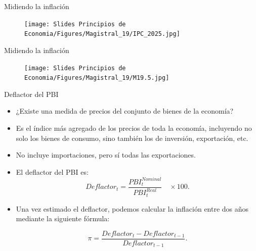 \documentclass{beamer}
\begin{document}
\begin{frame}{Midiendo la inflación}
\begin{figure} [H]  
\texttt{[image: Slides Principios de Economia/Figures/Magistral\_19/IPC\_2025.jpg]}
\end{figure}
\end{frame}


\begin{frame}{Midiendo la inflación}
\begin{figure} [H]  
\texttt{[image: Slides Principios de Economia/Figures/Magistral\_19/M19.5.jpg]}
\end{figure}
\end{frame}

\begin{frame}{Deflactor del PBI }
\begin{itemize}
\item ¿Existe una medida de precios del conjunto de bienes de la economía? 
\item Es el índice más agregado de los precios de toda la economía, incluyendo no solo los bienes de consumo, sino también los de inversión, exportación, etc. 
\item No incluye importaciones, pero sí todas las exportaciones.
\item El deflactor del PBI es:  \vspace{1mm}
\begin{equation*}
    Deflactor_{t}=\frac{PBI_{t}^{Nominal}}{PBI_{t}^{Real}}\quad \times 100.
\end{equation*}

\item Una vez estimado el deflactor, podemos calcular la inflación entre dos años mediante la siguiente fórmula:

\begin{equation*}
\pi =\frac{Deflactor_{t} - Deflactor_{t-1}}{Deflactor_{t-1}}.
\end{equation*}

\end{itemize}
\end{frame}
\end{document}

